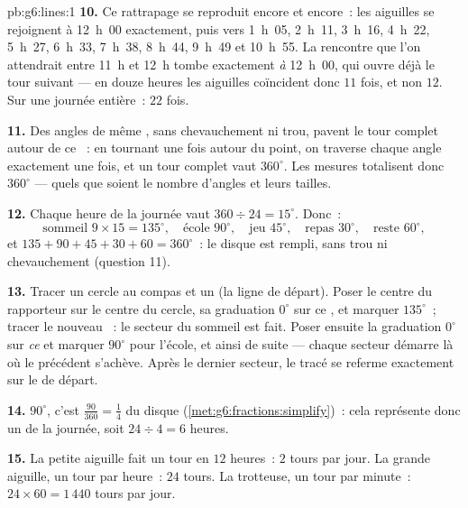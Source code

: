 \begin{solution}{pb:g6:lines:1}
\textbf{10.} Ce rattrapage se reproduit encore et encore~: les
aiguilles se rejoignent à 12~h~00 exactement, puis vers 1~h~05,
2~h~11, 3~h~16, 4~h~22, 5~h~27, 6~h~33, 7~h~38, 8~h~44, 9~h~49 et
10~h~55. La rencontre que l'on attendrait entre 11~h et 12~h tombe
exactement \emph{à} 12~h~00, qui ouvre déjà le tour suivant --- en
douze heures les aiguilles coïncident donc $11$ fois, et non $12$.
Sur une journée entière~: $22$ fois.

\textbf{11.} Des angles de même , sans chevauchement ni trou,
pavent le tour complet autour de ce ~: en tournant une fois
autour du point, on traverse chaque angle exactement une fois, et un
tour complet vaut $360^\circ$. Les mesures totalisent donc
$360^\circ$ --- quels que soient le nombre d'angles et leurs
tailles.

\textbf{12.} Chaque heure de la journée vaut
$360 \div 24 = 15^\circ$. Donc~:
\[
\text{sommeil } 9 \times 15 = 135^\circ, \quad
\text{école } 90^\circ, \quad
\text{jeu } 45^\circ, \quad
\text{repas } 30^\circ, \quad
\text{reste } 60^\circ,
\]
et $135 + 90 + 45 + 30 + 60 = 360^\circ$~: le disque est rempli,
sans trou ni chevauchement (question 11).

\textbf{13.} Tracer un cercle au compas et un  (la ligne de
départ). Poser le centre du rapporteur sur le centre du cercle, sa
graduation $0^\circ$ sur ce , et marquer $135^\circ$~; tracer
le nouveau ~: le secteur du sommeil est fait. Poser ensuite la
graduation $0^\circ$ sur \emph{ce}  et marquer $90^\circ$ pour
l'école, et ainsi de suite --- chaque secteur démarre là où le
précédent s'achève. Après le dernier secteur, le tracé se referme
exactement sur le  de départ.

\textbf{14.} $90^\circ$, c'est $\frac{90}{360} = \frac14$ du disque
(\cref{met:g6:fractions:simplify})~: cela représente donc un 
de la journée, soit $24 \div 4 = 6$ heures.

\textbf{15.} La petite aiguille fait un tour en $12$ heures~: $2$
tours par jour. La grande aiguille, un tour par heure~: $24$ tours.
La trotteuse, un tour par minute~: $24 \times 60 = 1\,440$ tours par
jour.
\end{solution}
